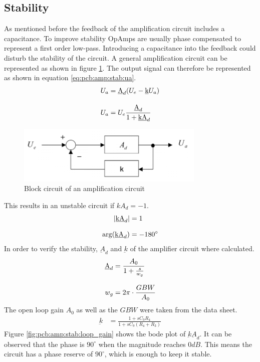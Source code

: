 \subsection{Stability}

As mentioned before the feedback of the amplification circuit includes a capacitance. To improve stability OpAmps are usually phase compensated to represent a first order low-pass. Introducing a capacitance into the feedback could disturb the stability of the circuit.\cite{okorn_analoge_2021}\p
A general amplification circuit can be represented as shown in figure \ref{fig:pcb:amp:stab:block}. The output signal can therefore be represented as shown in equation \ref{eq:pcb:amp:stab:ua}.
%
\begin{align}
  U_a &= \underbar{A}_d (U_e - \underbar{k}U_a)\pmath
  U_a &= U_e \cfrac{\underbar{A}_d}{1 + \underbar{k}\underbar{A}_d}\label{eq:pcb:amp:stab:ua}
\end{align}
%
\begin{figure}[ht]
  \centering
  \includegraphics[width=0.8\textwidth]{src/assets/pictures/circuit/amp_block_circuit.png}
  \caption{Block circuit of an amplification circuit\cite{okorn_analoge_2021}}\label{fig:pcb:amp:stab:block}
\end{figure}
%
This results in an unstable circuit if $kA_d = -1$.
%
\begin{align}
  |\underbar{k}\underbar{A}_d| &= 1\pmath
  \arg(\underbar{k}\underbar{A}_d) &= - 180^\circ
\end{align}
%
In order to verify the stability, $\underbar{A}_d$ and $\underbar{k}$ of the amplifier circuit where calculated.
%
\begin{align}
  \underbar{A}_d &= \frac{A_0}{1 + \frac{s}{w_g}}\pmath
  w_g &= 2\pi \cdot \frac{GBW}{A_0}
\end{align}
%
The open loop gain $A_0$ as well as the $GBW$ were taken from the data sheet.\cite{texas_instruments_tl08xx_2021}
%
\begin{align}
  \underbar{k} &= \frac{1 + s C_9 R_4}{1 + s C_9 (R_4 + R_3)}
\end{align}
%
Figure \ref{fig:pcb:amp:stab:loop_gain} shows the bode plot of $\underbar{k}\underbar{A}_d$. It can be observed that the phase is $90^\circ$ when the magnitude reaches $0dB$. This means the circuit has a phase reserve of $90^\circ$, which is enough to keep it stable.
